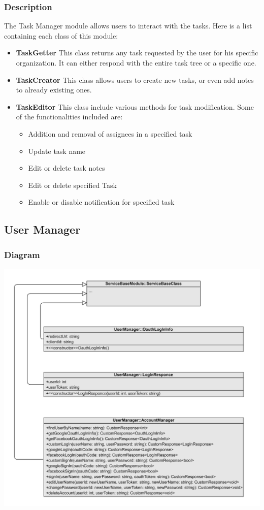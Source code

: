 \documentclass{article}
\begin{document}
\subsubsection{Description}
The Task Manager module allows users to interact with the tasks. Here is a list containing each class of this module:
\begin{itemize}
    \item \textbf{TaskGetter}
    This class returns any task requested by the user for his specific organization. It can either respond with the entire task tree or a specific one.
    \item \textbf{TaskCreator}
    This class allows users to create new tasks, or even add notes to already existing ones.
    \item \textbf{TaskEditor}
    This class include various methods for task modification. Some of the functionalities included are:
    \begin{itemize}
        \item Addition and removal of assignees in a specified task
        \item Update task name
        \item Edit or delete task notes
        \item Edit or delete specified Task
        \item Enable or disable notification for specified task
    \end{itemize}
\end{itemize}
\subsection{User Manager}

\subsubsection{Diagram}

\includegraphics[width=\textwidth,height=\textheight,keepaspectratio]{images/class_diagram/user_manager.jpg}
\end{document}
